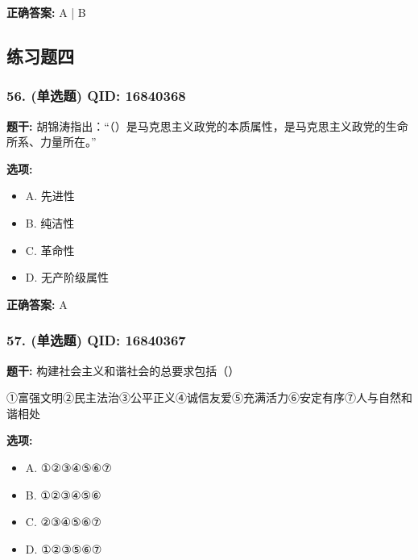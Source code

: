\documentclass[12pt,UTF8]{ctexart}
\begin{document}
\textbf{正确答案:}
A | B

\vspace{0.3em}\hrulefill\vspace{0.7em}

\subsection*{练习题四}

\subsubsection*{56. (单选题) \small QID: 16840368}

\textbf{题干:}
胡锦涛指出：“（）是马克思主义政党的本质属性，是马克思主义政党的生命所系、力量所在。”

\textbf{选项:}
\begin{itemize}[leftmargin=*]

  \item A. 先进性

  \item B. 纯洁性

  \item C. 革命性

  \item D. 无产阶级属性

\end{itemize}

\textbf{正确答案:}
A

\vspace{0.3em}\hrulefill\vspace{0.7em}

\subsubsection*{57. (单选题) \small QID: 16840367}

\textbf{题干:}
构建社会主义和谐社会的总要求包括（）
\par
①富强文明②民主法治③公平正义④诚信友爱⑤充满活力⑥安定有序⑦人与自然和谐相处

\textbf{选项:}
\begin{itemize}[leftmargin=*]

  \item A. ①②③④⑤⑥⑦

  \item B. ①②③④⑤⑥

  \item C. ②③④⑤⑥⑦

  \item D. ①②③⑤⑥⑦

\end{itemize}
\end{document}
